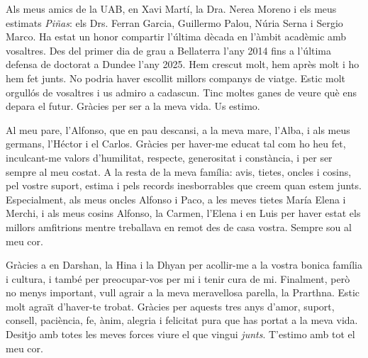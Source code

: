 Als meus amics de la UAB, en Xavi Martí, la Dra. Nerea Moreno i els meus estimats \textit{Piñas}: els Drs. Ferran Garcia, Guillermo Palou, Núria Serna i Sergio Marco. Ha estat un honor compartir l'última dècada en l'àmbit acadèmic amb vosaltres. Des del primer dia de grau a Bellaterra l'any 2014 fins a l'última defensa de doctorat a Dundee l'any 2025. Hem crescut molt, hem après molt i ho hem fet junts. No podria haver escollit millors companys de viatge. Estic molt orgullós de vosaltres i us admiro a cadascun. Tinc moltes ganes de veure què ens depara el futur. Gràcies per ser a la meva vida. Us estimo.

Al meu pare, l'Alfonso, que en pau descansi, a la meva mare, l'Alba, i als meus germans, l'Héctor i el Carlos. Gràcies per haver-me educat tal com ho heu fet, inculcant-me valors d'humilitat, respecte, generositat i constància, i per ser sempre al meu costat. A la resta de la meva família: avis, tietes, oncles i cosins, pel vostre suport, estima i pels records inesborrables que creem quan estem junts. Especialment, als meus oncles Alfonso i Paco, a les meves tietes María Elena i Merchi, i als meus cosins Alfonso, la Carmen, l'Elena i en Luis per haver estat els millors amfitrions mentre treballava en remot des de casa vostra. Sempre sou al meu cor.

Gràcies a en Darshan, la Hina i la Dhyan per acollir-me a la vostra bonica família i cultura, i també per preocupar-vos per mi i tenir cura de mi. Finalment, però no menys important, vull agrair a la meva meravellosa parella, la Prarthna. Estic molt agraït d'haver-te trobat. Gràcies per aquests tres anys d'amor, suport, consell, paciència, fe, ànim, alegria i felicitat pura que has portat a la meva vida. Desitjo amb totes les meves forces viure el que vingui \textit{junts}. T'estimo amb tot el meu cor.
